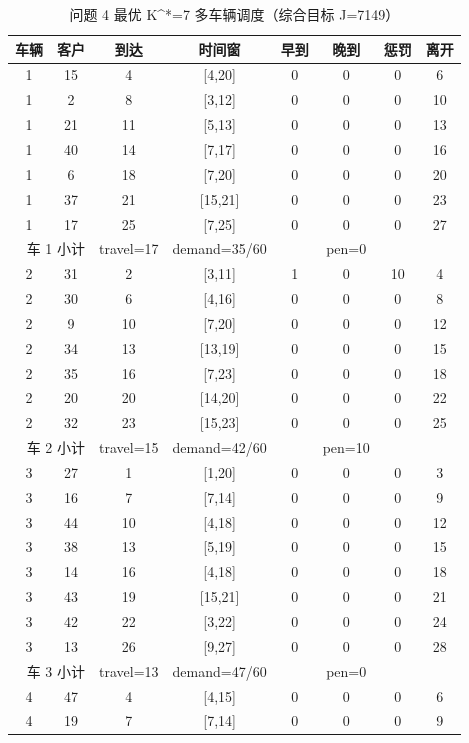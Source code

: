 \begin{table}[htbp]
\centering
\caption{问题 4 最优 K^*=7 多车辆调度（综合目标 J=7149）}\label{tab:q4_routes}
\small
\begin{tabular}{cccccccc}
\toprule
车辆 & 客户 & 到达 & 时间窗 & 早到 & 晚到 & 惩罚 & 离开 \\
\midrule
1 & 15 & 4 & [4,20] & 0 & 0 & 0 & 6 \\
1 & 2 & 8 & [3,12] & 0 & 0 & 0 & 10 \\
1 & 21 & 11 & [5,13] & 0 & 0 & 0 & 13 \\
1 & 40 & 14 & [7,17] & 0 & 0 & 0 & 16 \\
1 & 6 & 18 & [7,20] & 0 & 0 & 0 & 20 \\
1 & 37 & 21 & [15,21] & 0 & 0 & 0 & 23 \\
1 & 17 & 25 & [7,25] & 0 & 0 & 0 & 27 \\
\multicolumn{2}{r}{车 1 小计} & travel=17 & demand=35/60 & & pen=0 & \\
\midrule
2 & 31 & 2 & [3,11] & 1 & 0 & 10 & 4 \\
2 & 30 & 6 & [4,16] & 0 & 0 & 0 & 8 \\
2 & 9 & 10 & [7,20] & 0 & 0 & 0 & 12 \\
2 & 34 & 13 & [13,19] & 0 & 0 & 0 & 15 \\
2 & 35 & 16 & [7,23] & 0 & 0 & 0 & 18 \\
2 & 20 & 20 & [14,20] & 0 & 0 & 0 & 22 \\
2 & 32 & 23 & [15,23] & 0 & 0 & 0 & 25 \\
\multicolumn{2}{r}{车 2 小计} & travel=15 & demand=42/60 & & pen=10 & \\
\midrule
3 & 27 & 1 & [1,20] & 0 & 0 & 0 & 3 \\
3 & 16 & 7 & [7,14] & 0 & 0 & 0 & 9 \\
3 & 44 & 10 & [4,18] & 0 & 0 & 0 & 12 \\
3 & 38 & 13 & [5,19] & 0 & 0 & 0 & 15 \\
3 & 14 & 16 & [4,18] & 0 & 0 & 0 & 18 \\
3 & 43 & 19 & [15,21] & 0 & 0 & 0 & 21 \\
3 & 42 & 22 & [3,22] & 0 & 0 & 0 & 24 \\
3 & 13 & 26 & [9,27] & 0 & 0 & 0 & 28 \\
\multicolumn{2}{r}{车 3 小计} & travel=13 & demand=47/60 & & pen=0 & \\
\midrule
4 & 47 & 4 & [4,15] & 0 & 0 & 0 & 6 \\
4 & 19 & 7 & [7,14] & 0 & 0 & 0 & 9 \\

\end{tabular}
\end{table}
